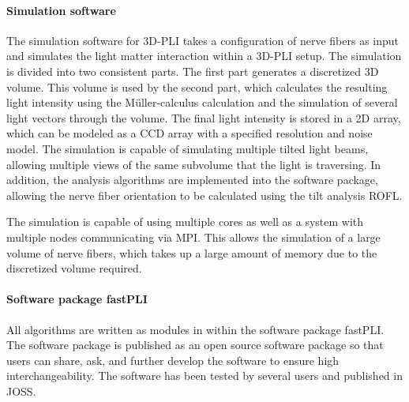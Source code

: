 \paragraph{Simulation software}
%
The simulation software for \ac{3D-PLI} takes a configuration of nerve fibers as input and simulates the light matter interaction within a \ac{3D-PLI} setup.
The simulation is divided into two consistent parts.
The first part generates a discretized 3D volume.
This volume is used by the second part, which calculates the resulting light intensity using the M{\"u}ller-calculus calculation and the simulation of several light vectors through the volume.
The final light intensity is stored in a 2D array, which can be modeled as a \ac{CCD} array with a specified resolution and noise model.
The simulation is capable of simulating multiple tilted light beams, allowing multiple views of the same subvolume that the light is traversing.
In addition, the analysis algorithms are implemented into the software package, allowing the nerve fiber orientation to be calculated using the tilt analysis \ac{ROFL}.
\par
%
The simulation is capable of using multiple cores as well as a system with multiple nodes communicating via \ac{MPI}.
This allows the simulation of a large volume of nerve fibers, which takes up a large amount of memory due to the discretized volume required.
%
%
%
\paragraph{Software package \acs{fastPLI}}
%
All algorithms are written as modules in \python{} within the software package \ac{fastPLI}.
The software package is published as an open source software package so that users can share, ask, and further develop the software to ensure high interchangeability.
The software has been tested by several users and published in \ac{JOSS}.
%
%
%
